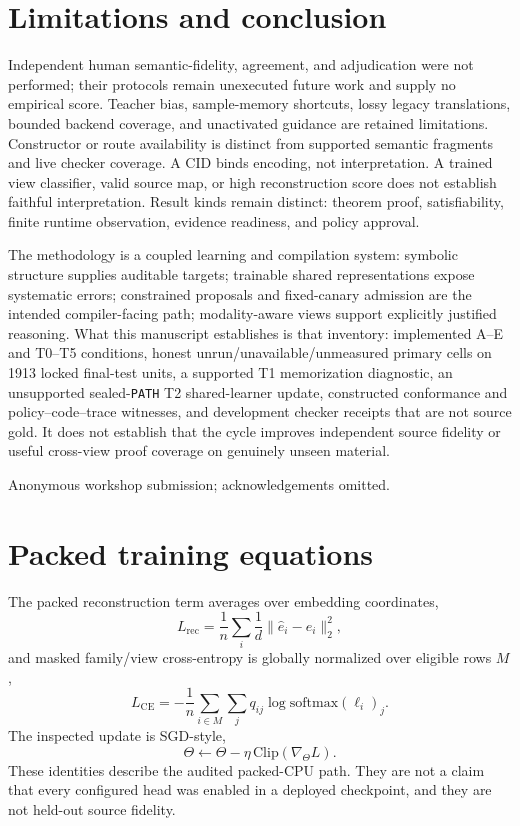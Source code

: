 \documentclass{article}
\begin{document}
\section{Limitations and conclusion}
Independent human semantic-fidelity, agreement, and adjudication were not performed; their protocols remain unexecuted future work and supply no empirical score. Teacher bias, sample-memory shortcuts, lossy legacy translations, bounded backend coverage, and unactivated guidance are retained limitations. Constructor or route availability is distinct from supported semantic fragments and live checker coverage. A CID binds encoding, not interpretation. A trained view classifier, valid source map, or high reconstruction score does not establish faithful interpretation. Result kinds remain distinct: theorem proof, satisfiability, finite runtime observation, evidence readiness, and policy approval.

The methodology is a coupled learning and compilation system: symbolic structure supplies auditable targets; trainable shared representations expose systematic errors; constrained proposals and fixed-canary admission are the intended compiler-facing path; modality-aware views support explicitly justified reasoning. What this manuscript establishes is that inventory: implemented A--E and T0--T5 conditions, honest unrun/unavailable/unmeasured primary cells on 1913 locked final-test units, a supported T1 memorization diagnostic, an unsupported sealed-\texttt{PATH} T2 shared-learner update, constructed conformance and policy--code--trace witnesses, and development checker receipts that are not source gold. It does not establish that the cycle improves independent source fidelity or useful cross-view proof coverage on genuinely unseen material.

\begin{ack}
Anonymous workshop submission; acknowledgements omitted.
\end{ack}




\appendix
\section{Packed training equations}
\label{app:packed}
The packed reconstruction term averages over embedding coordinates,
\begin{equation}
L_{\mathrm{rec}}=\frac1n\sum_i\frac1d\|\hat e_i-e_i\|_2^2,
\label{eq:rec}
\end{equation}
and masked family/view cross-entropy is globally normalized over eligible rows $M$,
\begin{equation}
L_{\mathrm{CE}}=-\frac1n\sum_{i\in M}\sum_j q_{ij}\log\mathrm{softmax}(\ell_i)_j.
\label{eq:ce}
\end{equation}
The inspected update is SGD-style,
\begin{equation}
\Theta\leftarrow\Theta-\eta\,\mathrm{Clip}(\nabla_\Theta L).
\label{eq:sgd}
\end{equation}
These identities describe the audited packed-CPU path. They are not a claim that every configured head was enabled in a deployed checkpoint, and they are not held-out source fidelity.
\end{document}
